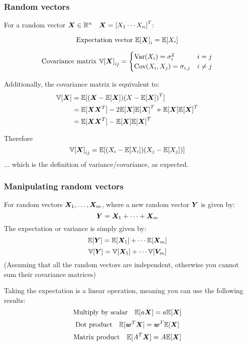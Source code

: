 \documentclass[../../main.tex]{subfiles}
\begin{document}
\subsubsection{Random vectors}

For a random vector $\bm{X} \in \mathbb{R}^n \quad \bm{X} = {\left[X_1 \cdots X_n \right]}^T$:

\[ \textrm{Expectation vector  } {\mathbb{E}[ \bm{X} ]}_i = \mathbb{E}[X_i]
\]

\[ \textrm{Covariance matrix  } {\mathbb{V}[ \bm{X} ]}_{ij} =
\begin{cases}
    \textrm{Var}(X_i) = \sigma_i^2 & i = j \\
    \textrm{Cov}(X_i, X_j) = \sigma_{i,j} & i \neq j
\end{cases}
\]

Additionally, the covariance matrix is equivalent to:
\begin{align*}
\mathbb{V}[\bm{X}]
&= \mathbb{E}[(\bm{X} - \mathbb{E}[\bm{X}]){(X - \mathbb{E}[\bm{X}])}^T] \\
&= \mathbb{E}[\bm{X}\bm{X}^T] - 2\mathbb{E}[\bm{X}]{\mathbb{E}[ \bm{X} ]}^T + \mathbb{E}[\bm{X}]{\mathbb{E}[ \bm{X} ]}^T \\
&= \mathbb{E}[\bm{X}\bm{X}^T] - \mathbb{E}[\bm{X}]{\mathbb{E}[ \bm{X} ]}^T
\end{align*}

Therefore
\[
{\mathbb{V}[\bm{X}]}_{ij} =
\mathbb{E}[(X_i - \mathbb{E}[X_i])(X_j - \mathbb{E}[X_j])]
\]
$\ldots$ which is the definition of variance/covariance, as expected.

\subsubsection{Manipulating random vectors}

For random vectors $\bm{X}_1, \ldots, \bm{X}_m$, where a new random vector $\bm{Y}$ is given by:
\[ \bm{Y} = \bm{X}_1 + \cdots + \bm{X}_m \]
The expectation or variance is simply given by:
\[ \mathbb{E}[\bm{Y}] = \mathbb{E}[\bm{X}_1] + \cdots \mathbb{E}[\bm{X}_m] \]
\[ \mathbb{V}[\bm{Y}] = \mathbb{V}[\bm{X}_1] + \cdots \mathbb{V}[\bm{V}_m] \]
(Assuming that all the random vectors are independent, otherwise you cannot sum their covariance matrices)

Taking the expectation is a linear operation, meaning you can use the following results:
\[ \textrm{Multiply by scalar}\quad \mathbb{E}[a\bm{X}] = a\mathbb{E}[\bm{X}] \]
\[ \textrm{Dot product}\quad \mathbb{E}[\bm{w}^T\bm{X}] = \bm{w}^T\mathbb{E}[\bm{X}] \]
\[ \textrm{Matrix product}\quad \mathbb{E}[A^T\bm{X}] = A\mathbb{E}[\bm{X}] \]
\end{document}
